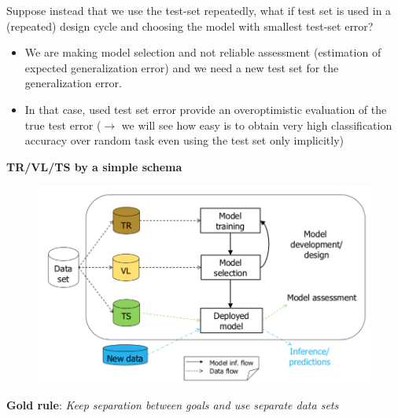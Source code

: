\documentclass[../main.tex]{subfiles}
\begin{document}
Suppose instead that we use the test-set repeatedly, what if test set is used in a (repeated) design cycle and choosing the model with smallest test-set error?
\begin{itemize}
    \item We are making model selection and not reliable assessment (estimation of expected generalization error) and we need a new test set for the generalization error.

    \item In that case, used test set error provide an overoptimistic evaluation of the true test error ($\rightarrow$ we will see how easy is to obtain very high classification accuracy over random task even using the test set only implicitly)
\end{itemize}

\textbf{TR/VL/TS by a simple schema}
\begin{figure}[H]
    \centering
    \includegraphics[scale = 0.4]{lectures/1_Introduction/intro_cross_valid_schema.png}
\end{figure}
\begin{center}
    \textbf{Gold rule}:\textit{ Keep separation between goals and use separate data sets}
\end{center}
\end{document}
